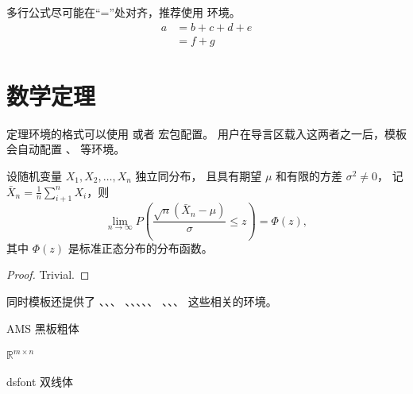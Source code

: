 多行公式尽可能在“=”处对齐，推荐使用  环境。
\begin{align}
  a & = b + c + d + e \\
    & = f + g
\end{align}



\section{数学定理}

定理环境的格式可以使用  或者  宏包配置。
用户在导言区载入这两者之一后，模板会自动配置 、 等环境。

\begin{theorem}
  设随机变量 $X_1, X_2, \dots, X_n$ 独立同分布， 且具有期望 $\mu$ 和有限的方差 $\sigma^2 \ne 0$，
  记 $\bar{X}_n = \frac{1}{n} \sum_{i+1}^n X_i$，则
  \begin{equation}
    \lim_{n \to \infty} P \left(\frac{\sqrt{n} \left( \bar{X}_n - \mu \right)}{\sigma} \le z \right) = \Phi(z),
  \end{equation}
  其中 $\Phi(z)$ 是标准正态分布的分布函数。
\end{theorem}
\begin{proof}
  Trivial.
\end{proof}




同时模板还提供了 、、、
、、、、、
、、、 这些相关的环境。



AMS 黑板粗体

$\mathbb{R}^{m\times n}$

dsfont 双线体

